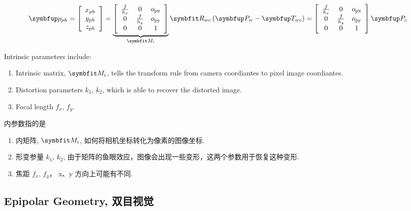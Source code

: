 \begin{equation}
\Vect{p}_{ph}=\left[\begin{array}{c}{x_{ph}} \\ {y_{ph}} \\ {z_{ph}}\end{array}\right]=\underbrace{\left[\begin{array}{ccc}{\frac{f}{h_{x}}} & {0} & {o_{\mathrm{px}}} \\ {0} & {\frac{f}{h_{y}}} & {o_{\mathrm{py}}} \\ {0} & {0} & {1}\end{array}\right]}_{\Matr{M}_i} \Matr{R}_{wc}  \left(\Vect{P}_{w}-\Vect{T}_{wc}\right)=\left[\begin{array}{ccc}{\frac{f}{h_{x}}} & {0} & {o_{\mathrm{px}}} \\ {0} & {\frac{f}{h_{y}}} & {o_{\mathrm{py}}} \\ {0} & {0} & {1}\end{array}\right] \Vect{P}_c
\end{equation}

\begin{definition}
Intrinsic parameters include:
\begin{enumerate}
	\item Intrinsic matrix, $\Matr{M}_i$, tells the transform rule from camera coordiantes to pixel image coordiantes.
	\item Distortion parameters $k_1$, $k_2$, which is able to recover the distorted image.
	\item Focal length $f_x$, $f_y$. 
\end{enumerate}

内参数指的是
\begin{enumerate}
	\item 内矩阵, $\Matr{M}_i$, 如何将相机坐标转化为像素的图像坐标.
	\item 形变参量 $k_1$, $k_2$, 由于矩阵的鱼眼效应，图像会出现一些变形，这两个参数用于恢复这种变形.
	\item 焦距 $f_x$, $f_y$， x、y 方向上可能有不同. 
\end{enumerate}
\end{definition}

\subsection{Epipolar Geometry, 双目视觉}

